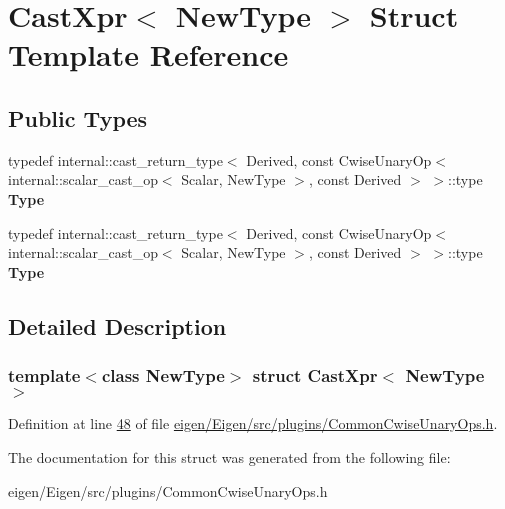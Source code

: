 \hypertarget{struct_cast_xpr}{}\section{Cast\+Xpr$<$ New\+Type $>$ Struct Template Reference}
\label{struct_cast_xpr}
\subsection*{Public Types}
\begin{DoxyCompactItemize}
\item 
\mbox{\label{struct_cast_xpr_a1e5100db77edfeba152c8ee6efe96c95}} 
typedef internal\+::cast\+\_\+return\+\_\+type$<$ Derived, const Cwise\+Unary\+Op$<$ internal\+::scalar\+\_\+cast\+\_\+op$<$ Scalar, New\+Type $>$, const Derived $>$ $>$\+::type {\bfseries Type}
\item 
\mbox{\label{struct_cast_xpr_a1e5100db77edfeba152c8ee6efe96c95}} 
typedef internal\+::cast\+\_\+return\+\_\+type$<$ Derived, const Cwise\+Unary\+Op$<$ internal\+::scalar\+\_\+cast\+\_\+op$<$ Scalar, New\+Type $>$, const Derived $>$ $>$\+::type {\bfseries Type}
\end{DoxyCompactItemize}


\subsection{Detailed Description}
\subsubsection*{template$<$class New\+Type$>$\newline
struct Cast\+Xpr$<$ New\+Type $>$}



Definition at line \hyperlink{eigen_2_eigen_2src_2plugins_2_common_cwise_unary_ops_8h_source_l00048}{48} of file \hyperlink{eigen_2_eigen_2src_2plugins_2_common_cwise_unary_ops_8h_source}{eigen/\+Eigen/src/plugins/\+Common\+Cwise\+Unary\+Ops.\+h}.



The documentation for this struct was generated from the following file\+:\begin{DoxyCompactItemize}
\item 
eigen/\+Eigen/src/plugins/\+Common\+Cwise\+Unary\+Ops.\+h\end{DoxyCompactItemize}
